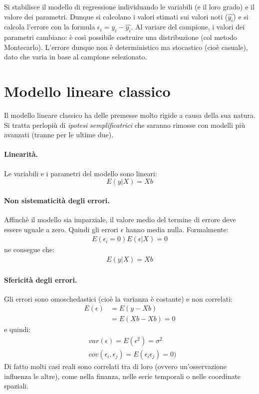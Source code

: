 \documentclass[11pt, twocolumn]{article}
\begin{document}
Si stabilisce il modello di regressione individuando le variabili (e il loro grado) e il valore dei parametri.
Dunque si calcolano i valori stimati sui valori noti ($\hat{y_i}$) e si calcola l'errore con la formula $\epsilon_i = y_i - \hat{y_i}$.
Al variare del campione, i valori dei parametri cambiano: è così possibile costruire una distribuzione (col metodo Montecarlo).
L'errore dunque non è deterministico ma stocastico (cioè casuale), dato che varia in base al campione selezionato.

\newpage
\part{Modello lineare classico}
Il modello lineare classico ha delle premesse molto rigide a causa della sua natura.
Si tratta perlopiù di \textit{ipotesi semplificatrici} che saranno rimosse con modelli più avanzati (tranne per le ultime due).

\subsection*{Linearità.}
Le variabili e i parametri del modello sono lineari:
\begin{equation*}
  E(y | X) = Xb
\end{equation*}

\subsection*{Non sistematicità degli errori.}
Affinchè il modello sia imparziale, il valore medio del termine di errore deve essere uguale a zero. Quindi gli errori $\epsilon$ hanno media nulla.
\newline
Formalmente:
\begin{align*}
E(\epsilon_i = 0)
E(\epsilon | X) = 0
\end{align*}
ne consegue che:
\begin{align*}
E(y | X) = Xb
\end{align*}

\subsection*{Sfericità degli errori.}
Gli errori sono omoschedastici (cioè la varianza è costante) e non correlati:
\begin{align*}
  E(\epsilon) &= E(y - Xb) \\
              &= E(Xb - Xb) = 0
\end{align*}
e quindi:
\begin{align*}
  &var(\epsilon) = E(\epsilon^2) = \sigma^2 \\
  &cov(\epsilon_i, \epsilon_j) = E(\epsilon_i\epsilon_j) = 0)
\end{align*}
Di fatto molti casi reali sono correlati tra di loro (ovvero un'osservazione influenza le altre), come nella finanza, nelle serie temporali o nelle coordinate spaziali.
\end{document}
